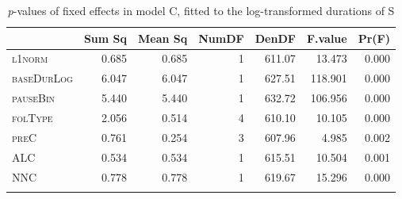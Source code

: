 \begin{table}[H]\fontsize{10}{11}
\caption{\textit{p}-values of fixed effects in model C, fitted to the log-transformed durations of S}
\label{tab:5.10}
\centering
\begin{tabular}{lrrrrrr} 
\lsptoprule
~          & Sum Sq & Mean Sq & NumDF & DenDF  & F.value & Pr(F)  \\ 
\midrule
\textsc{l1norm}     & 0.685  & 0.685   & 1     & 611.07 & 13.473  & 0.000  \\
\textsc{baseDurLog} & 6.047  & 6.047   & 1     & 627.51 & 118.901 & 0.000  \\
\textsc{pauseBin}   & 5.440  & 5.440   & 1     & 632.72 & 106.956 & 0.000  \\
\textsc{folType}    & 2.056  & 0.514   & 4     & 610.10 & 10.105  & 0.000  \\
\textsc{preC}       & 0.761  & 0.254   & 3     & 607.96 & 4.985   & 0.002  \\
\textsc{ALC}        & 0.534  & 0.534   & 1     & 615.51 & 10.504  & 0.001  \\
\textsc{NNC}        & 0.778  & 0.778   & 1     & 619.67 & 15.296  & 0.000  \\
\lspbottomrule
\end{tabular}
\end{table}




